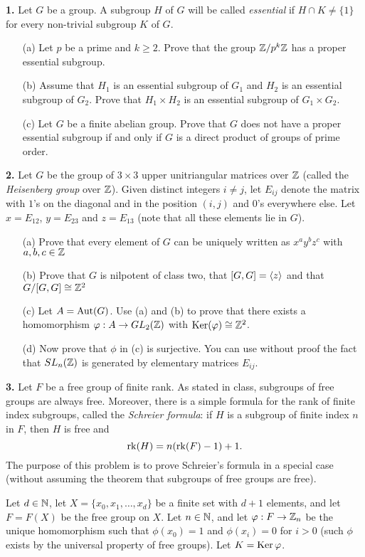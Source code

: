 \documentclass[12pt]{amsart}
\begin{document}
\skv
{\bf 1.} Let $G$ be a group. A subgroup $H$ of $G$ will be called {\it essential}
if $H\cap K\neq \{1\}$ for every non-trivial subgroup $K$ of $G$.
\begin{itemize}
\item[(a)] Let $p$ be a prime and $k\geq 2$. Prove that the group ${\mathbb Z}/p^k{\mathbb Z}$
has a proper essential subgroup.
\item[(b)] Assume that $H_1$ is an essential subgroup of $G_1$ and $H_2$
is an essential subgroup of $G_2$. Prove that $H_1\times H_2$ is an essential subgroup
of $G_1\times G_2$.
\item[(c)] Let $G$ be a finite abelian group. Prove that $G$ does not have a proper
essential subgroup if and only if $G$ is a direct product of groups of prime order.
\end{itemize}
\skv
{\bf 2.} Let $G$ be the group of $3\times 3$ upper unitriangular matrices over ${\mathbb Z}$ (called the {\it Heisenberg group} over ${\mathbb Z}$). 
Given distinct integers $i\neq j$, let $E_{ij}$ denote the matrix with $1$'s on the diagonal and in the position $(i,j)$ and $0$'s everywhere else. Let $x=E_{12}$, $y=E_{23}$ and $z=E_{13}$ (note that all these elements lie in $G$).
\begin{itemize}
\item[(a)] Prove that every element of $G$ can be uniquely written as $x^a y^b z^c$ with $a,b,c\in{\mathbb Z}$
\item[(b)] Prove that $G$ is nilpotent of class two, that  $[G,G]={\langle} z{\rangle}$ and that $G/[G,G]\cong {\mathbb Z}^2$
\item[(c)] Let $A={\rm Aut}(G)$. Use (a) and (b) to prove that there exists a homomorphism ${\varphi}: A\to GL_2({\mathbb Z})$ with ${\rm Ker}({\varphi})\cong {\mathbb Z}^2$. 
\item[(d)] Now prove that $\phi$ in (c) is surjective. You can use without proof the fact that $SL_n({\mathbb Z})$ is generated by elementary matrices $E_{ij}$.
\end{itemize}


\skv
{\bf 3.} Let $F$ be a free group of finite rank. As stated in class, subgroups of free groups are always free. Moreover, there is a simple formula for the rank of finite index subgroups, called the {\it Schreier formula}: if $H$ is a subgroup of finite index $n$ in $F$, then $H$ is free and $${\rm rk}(H)= n({\rm rk}(F)-1)+1.$$ The purpose of this problem is to prove Schreier's formula in a special case (without assuming the theorem that subgroups of free groups are free).

Let $d\in{\mathbb N}$, let $X=\{x_0,x_1,\ldots, x_d\}$ be a finite set with $d+1$ elements, and let $F=F(X)$ be the free group on $X$. Let $n\in{\mathbb N}$, and let ${\varphi}: F\to{\mathbb Z}_n$ be the unique homomorphism
such that $\phi(x_0)=1$ and $\phi(x_i)=0$ for $i>0$ (such $\phi$ exists by the universal property
of free groups). Let $K={\rm Ker}\,{\varphi}$.
\end{document}
